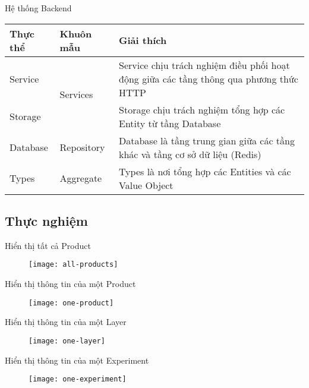 \begin{frame}{Hệ thống Backend}
	\begin{table}
		\begin{tabular}{|l|l|p{7cm}|}
			\hline
			Thực thể & Khuôn mẫu                 & Giải thích                                                                             \\ \hline
			Service  & \multirow{2}{*}{Services} & Service chịu trách nghiệm điều phối hoạt động giữa các tầng thông qua phương thức HTTP \\ \cline{1-1} \cline{3-3}
			Storage  &                           & Storage chịu trách nghiệm tổng hợp các Entity từ tầng Database                         \\ \hline
			Database & Repository                & Database là tầng trung gian giữa các tầng khác và tầng cơ sở dữ liệu (Redis)           \\ \hline
			Types    & Aggregate                 & Types là nơi tổng hợp các Entities và các Value Object                                 \\ \hline
		\end{tabular}
	\end{table}
\end{frame}

\subsection{Thực nghiệm}

\begin{frame}{Hiển thị tất cả Product}
	\begin{figure}
		\texttt{[image: all-products]}
	\end{figure}
\end{frame}

\begin{frame}{Hiển thị thông tin của một Product}
	\begin{figure}
		\centering
		\texttt{[image: one-product]}
	\end{figure}
\end{frame}

\begin{frame}{Hiển thị thông tin của một Layer}
	\begin{figure}
		\centering
		\texttt{[image: one-layer]}
	\end{figure}
\end{frame}

\begin{frame}{Hiển thị thông tin của một Experiment}
	\begin{figure}
		\centering
		\texttt{[image: one-experiment]}
	\end{figure}
\end{frame}
